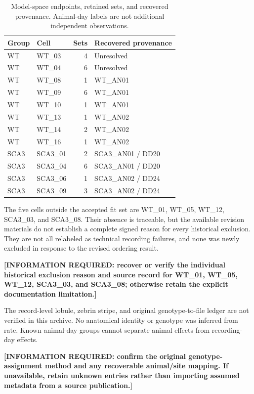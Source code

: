 \documentclass[11pt,a4paper]{article}
\newcommand{\required}[1]{\textbf{[INFORMATION REQUIRED: #1]}}
\begin{document}
\begin{table}[htbp]\centering\small
\caption{Model-space endpoints, retained sets, and recovered provenance. Animal-day labels are not additional independent observations.}
\begin{tabular}{@{}llrl@{}}\toprule Group&Cell&Sets&Recovered provenance\\\midrule
WT&WT\_03&4&Unresolved\\WT&WT\_04&6&Unresolved\\WT&WT\_08&1&WT\_AN01\\WT&WT\_09&6&WT\_AN01\\WT&WT\_10&1&WT\_AN01\\WT&WT\_13&1&WT\_AN02\\WT&WT\_14&2&WT\_AN02\\WT&WT\_16&1&WT\_AN02\\
SCA3&SCA3\_01&2&SCA3\_AN01 / DD20\\SCA3&SCA3\_04&6&SCA3\_AN01 / DD20\\SCA3&SCA3\_06&1&SCA3\_AN02 / DD24\\SCA3&SCA3\_09&3&SCA3\_AN02 / DD24\\\bottomrule\end{tabular}\end{table}

The five cells outside the accepted fit set are WT\_01, WT\_05, WT\_12, SCA3\_03, and SCA3\_08. Their absence is traceable, but the available revision materials do not establish a complete signed reason for every historical exclusion. They are not all relabeled as technical recording failures, and none was newly excluded in response to the revised ordering result.

\required{recover or verify the individual historical exclusion reason and source record for WT\_01, WT\_05, WT\_12, SCA3\_03, and SCA3\_08; otherwise retain the explicit documentation limitation.}

The record-level lobule, zebrin stripe, and original genotype-to-file ledger are not verified in this archive. No anatomical identity or genotype was inferred from rate. Known animal-day groups cannot separate animal effects from recording-day effects.

\required{confirm the original genotype-assignment method and any recoverable animal/site mapping. If unavailable, retain unknown entries rather than importing assumed metadata from a source publication.}
\end{document}
